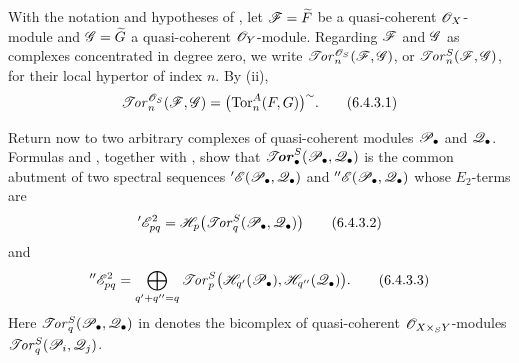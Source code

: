 \begin{env}[6.4.3]
\label{III.6.4.3}
With the notation and hypotheses of , let
$\mathscr{F}=\widetilde F$ be a quasi-coherent $\mathscr{O}_X$-module and
$\mathscr{G}=\widetilde G$ a quasi-coherent $\mathscr{O}_Y$-module.  Regarding
$\mathscr{F}$ and $\mathscr{G}$ as complexes concentrated in degree zero, we
write $\mathscr{T}\!\mathit{or}_n^{\mathscr{O}_S}(\mathscr{F},\mathscr{G})$, or
$\mathscr{T}\!\mathit{or}_n^S(\mathscr{F},\mathscr{G})$, for their local hypertor of index $n$.
By (ii),
\[
  \mathscr{T}\!\mathit{or}_n^{\mathscr{O}_S}(\mathscr{F},\mathscr{G})
  =
  \bigl(\operatorname{Tor}_n^A(F,G)\bigr)^{\sim}.
  \tag{6.4.3.1}\label{III.6.4.3.1}
\]

Return now to two arbitrary complexes of quasi-coherent modules
$\mathscr{P}_\bullet$ and $\mathscr{Q}_\bullet$.  Formulas
 and , together with
, show that
$\boldsymbol{\mathscr{T}\!\mathit{or}}_\bullet^S(\mathscr{P}_\bullet,\mathscr{Q}_\bullet)$ is the common abutment
of two spectral sequences
$'\mathscr{E}(\mathscr{P}_\bullet,\mathscr{Q}_\bullet)$ and
$''\mathscr{E}(\mathscr{P}_\bullet,\mathscr{Q}_\bullet)$ whose $E_2$-terms are
\[
  '\mathscr{E}_{pq}^2
  =
  \mathscr{H}_p\bigl(\mathscr{T}\!\mathit{or}_q^S(\mathscr{P}_\bullet,\mathscr{Q}_\bullet)\bigr)
  \tag{6.4.3.2}\label{III.6.4.3.2}
\]
and
\[
  ''\mathscr{E}_{pq}^2
  =
  \bigoplus_{q'+q''=q}
  \mathscr{T}\!\mathit{or}_p^S
  \bigl(\mathscr{H}_{q'}(\mathscr{P}_\bullet),
        \mathscr{H}_{q''}(\mathscr{Q}_\bullet)\bigr).
  \tag{6.4.3.3}\label{III.6.4.3.3}
\]
Here $\mathscr{T}\!\mathit{or}_q^S(\mathscr{P}_\bullet,\mathscr{Q}_\bullet)$ in
 denotes the bicomplex of quasi-coherent
$\mathscr{O}_{X\times_SY}$-modules
$\mathscr{T}\!\mathit{or}_q^S(\mathscr{P}_i,\mathscr{Q}_j)$.
\end{env}

